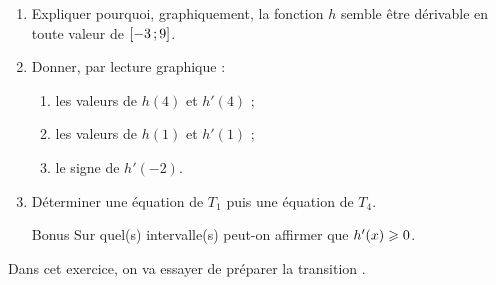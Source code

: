 \documentclass[a4paper,11pt]{article}
\begin{document}
%
\begin{enumerate}
	\item Expliquer pourquoi, graphiquement, la fonction $h$ semble être dérivable en toute valeur de $\mbox{\ensuremath{\left[-3\mathpunct{};9\right]}}$.
	\item Donner, par lecture graphique :
	\begin{enumerate}
		\item les valeurs de $h(4)$ et $h'(4)$ ;
		\item les valeurs de $h(1)$ et $h'(1)$ ;
		\item le signe de $h'(-2)$.
	\end{enumerate}
	\item Déterminer une équation de $T_1$ puis une équation de $T_4$.
	\item[Bonus] Sur quel(s) intervalle(s) peut-on affirmer que $h'(x) \geqslant 0$.
\end{enumerate}

\newpage


\medskip

Dans cet exercice, on va essayer de préparer la transition .
\end{document}
